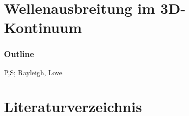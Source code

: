 \documentclass[hyperref={pdfpagemode=FullScreen, colorlinks=false}]{beamer}
\begin{document}
\maketitle

\section{Wellenausbreitung im 3D-Kontinuum}

\begin{frame}
\frametitle{Outline}

P,S; Rayleigh, Love
\end{frame}





\section*{Literaturverzeichnis}

\begin{frame}[allowframebreaks]{}
	\printbibliography
\end{frame}
\end{document}
